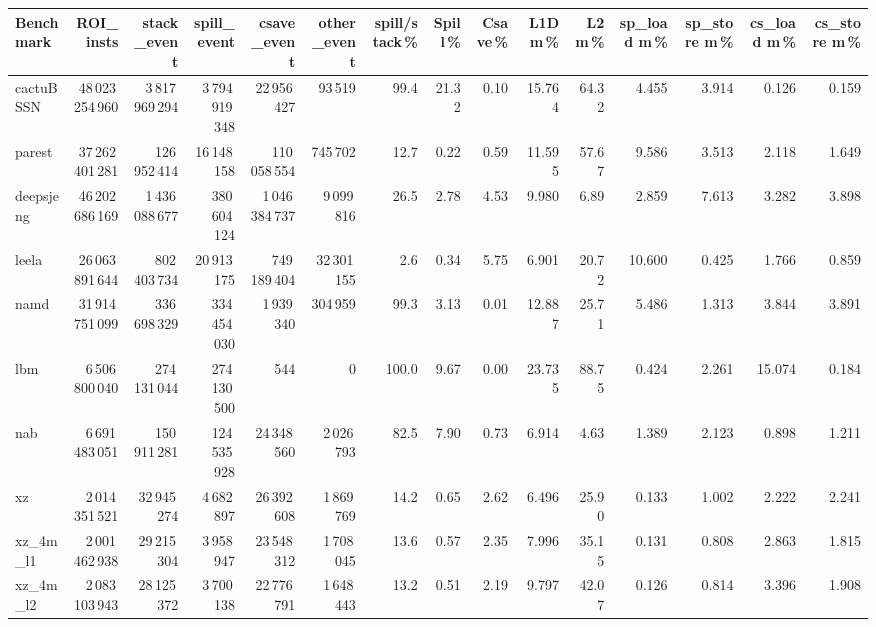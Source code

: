 \documentclass[9pt,landscape,a4paper]{article}
\begin{document}
\vspace{2mm}
\centering
\begin{adjustbox}{max width=\textwidth, max totalheight=0.50\textheight}%
\begin{tabular}{lrrrrrrrrrrrrrr}
\toprule
Benchmark & ROI\_insts & stack\_event & \textbf{spill\_event} & csave\_event & other\_event & spill/stack\,\% & Spill\,\% & Csave\,\% & L1D m\,\% & L2 m\,\% & sp\_load m\,\% & sp\_store m\,\% & cs\_load m\,\% & cs\_store m\,\% \\
\midrule
cactuBSSN & 48\,023\,254\,960 & 3\,817\,969\,294 & 3\,794\,919\,348 & 22\,956\,427 & 93\,519 & 99.4 & 21.32 & 0.10 & 15.764 & 64.32 & 4.455 & 3.914 & 0.126 & 0.159 \\
parest & 37\,262\,401\,281 & 126\,952\,414 & 16\,148\,158 & 110\,058\,554 & 745\,702 & 12.7 & 0.22 & 0.59 & 11.595 & 57.67 & 9.586 & 3.513 & 2.118 & 1.649 \\
deepsjeng & 46\,202\,686\,169 & 1\,436\,088\,677 & 380\,604\,124 & 1\,046\,384\,737 & 9\,099\,816 & 26.5 & 2.78 & 4.53 & 9.980 & 6.89 & 2.859 & 7.613 & 3.282 & 3.898 \\
leela & 26\,063\,891\,644 & 802\,403\,734 & 20\,913\,175 & 749\,189\,404 & 32\,301\,155 & 2.6 & 0.34 & 5.75 & 6.901 & 20.72 & 10.600 & 0.425 & 1.766 & 0.859 \\
namd & 31\,914\,751\,099 & 336\,698\,329 & 334\,454\,030 & 1\,939\,340 & 304\,959 & 99.3 & 3.13 & 0.01 & 12.887 & 25.71 & 5.486 & 1.313 & 3.844 & 3.891 \\
lbm & 6\,506\,800\,040 & 274\,131\,044 & 274\,130\,500 & 544 & 0 & 100.0 & 9.67 & 0.00 & 23.735 & 88.75 & 0.424 & 2.261 & 15.074 & 0.184 \\
nab & 6\,691\,483\,051 & 150\,911\,281 & 124\,535\,928 & 24\,348\,560 & 2\,026\,793 & 82.5 & 7.90 & 0.73 & 6.914 & 4.63 & 1.389 & 2.123 & 0.898 & 1.211 \\
xz & 2\,014\,351\,521 & 32\,945\,274 & 4\,682\,897 & 26\,392\,608 & 1\,869\,769 & 14.2 & 0.65 & 2.62 & 6.496 & 25.90 & 0.133 & 1.002 & 2.222 & 2.241 \\
xz\_4m\_l1 & 2\,001\,462\,938 & 29\,215\,304 & 3\,958\,947 & 23\,548\,312 & 1\,708\,045 & 13.6 & 0.57 & 2.35 & 7.996 & 35.15 & 0.131 & 0.808 & 2.863 & 1.815 \\
xz\_4m\_l2 & 2\,083\,103\,943 & 28\,125\,372 & 3\,700\,138 & 22\,776\,791 & 1\,648\,443 & 13.2 & 0.51 & 2.19 & 9.797 & 42.07 & 0.126 & 0.814 & 3.396 & 1.908 \\

\end{tabular}
\end{adjustbox}
\end{document}
